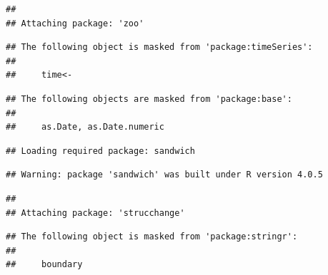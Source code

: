 \documentclass[
]{book}
\newenvironment{Shaded}{\begin{snugshade}}{\end{snugshade}}
\newcommand{\AttributeTok}[1]{\textcolor[rgb]{0.77,0.63,0.00}{#1}}
\newcommand{\ConstantTok}[1]{\textcolor[rgb]{0.00,0.00,0.00}{#1}}
\newcommand{\DecValTok}[1]{\textcolor[rgb]{0.00,0.00,0.81}{#1}}
\newcommand{\FunctionTok}[1]{\textcolor[rgb]{0.00,0.00,0.00}{#1}}
\newcommand{\NormalTok}[1]{#1}
\newcommand{\OtherTok}[1]{\textcolor[rgb]{0.56,0.35,0.01}{#1}}
\newcommand{\SpecialCharTok}[1]{\textcolor[rgb]{0.00,0.00,0.00}{#1}}
\begin{document}
\begin{verbatim}
## 
## Attaching package: 'zoo'
\end{verbatim}

\begin{verbatim}
## The following object is masked from 'package:timeSeries':
## 
##     time<-
\end{verbatim}

\begin{verbatim}
## The following objects are masked from 'package:base':
## 
##     as.Date, as.Date.numeric
\end{verbatim}

\begin{verbatim}
## Loading required package: sandwich
\end{verbatim}

\begin{verbatim}
## Warning: package 'sandwich' was built under R version 4.0.5
\end{verbatim}

\begin{verbatim}
## 
## Attaching package: 'strucchange'
\end{verbatim}

\begin{verbatim}
## The following object is masked from 'package:stringr':
## 
##     boundary
\end{verbatim}

\begin{Shaded}
\end{Shaded}
\end{document}
